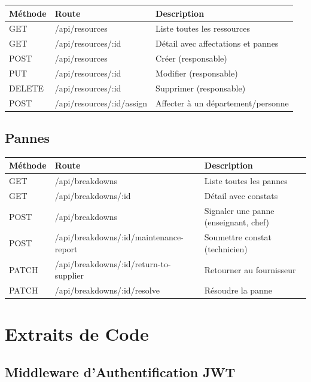 \begin{table}[h!]
\centering
\begin{tabularx}{\textwidth}{|l|l|X|}
\hline
\textbf{Méthode} & \textbf{Route} & \textbf{Description} \\
\hline
GET & /api/resources & Liste toutes les ressources \\
\hline
GET & /api/resources/:id & Détail avec affectations et pannes \\
\hline
POST & /api/resources & Créer (responsable) \\
\hline
PUT & /api/resources/:id & Modifier (responsable) \\
\hline
DELETE & /api/resources/:id & Supprimer (responsable) \\
\hline
POST & /api/resources/:id/assign & Affecter à un département/personne \\
\hline
\end{tabularx}
\end{table}

\subsection{Pannes}

\begin{table}[h!]
\centering
\begin{tabularx}{\textwidth}{|l|l|X|}
\hline
\textbf{Méthode} & \textbf{Route} & \textbf{Description} \\
\hline
GET & /api/breakdowns & Liste toutes les pannes \\
\hline
GET & /api/breakdowns/:id & Détail avec constats \\
\hline
POST & /api/breakdowns & Signaler une panne (enseignant, chef) \\
\hline
POST & /api/breakdowns/:id/maintenance-report & Soumettre constat (technicien) \\
\hline
PATCH & /api/breakdowns/:id/return-to-supplier & Retourner au fournisseur \\
\hline
PATCH & /api/breakdowns/:id/resolve & Résoudre la panne \\
\hline
\end{tabularx}
\end{table}

\section{Extraits de Code}

\subsection{Middleware d'Authentification JWT}

